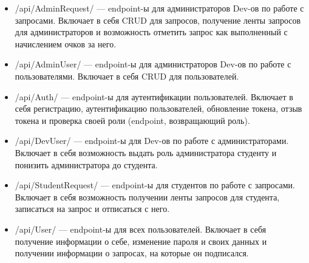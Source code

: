 \begin{itemize}
	\item{/api/AdminRequest/ --- endpoint-ы для администраторов Dev-ов по работе с запросами. Включает в себя CRUD для запросов, получение ленты запросов для администраторов и возможность отметить запрос как выполненный с начислением очков за него.}
	\item{/api/AdminUser/ --- endpoint-ы для администраторов Dev-ов по работе с пользователями. Включает в себя CRUD для пользователей.}
	\item{/api/Auth/ --- endpoint-ы для аутентификации пользователей. Включает в себя регистрацию, аутентификацию пользователей, обновление токена, отзыв токена и проверка своей роли (endpoint, возвращающий роль).}
	\item{/api/DevUser/ --- endpoint-ы для Dev-ов по работе с администраторами. Включает в себя возможность выдать роль администратора студенту и понизить администратора до студента.}
	\item{/api/StudentRequest/ --- endpoint-ы для студентов по работе с запросами. Включает в себя возможность получении ленты запросов для студента, записаться на запрос и отписаться с него.}
	\item{/api/User/ --- endpoint-ы для всех пользователей. Включает в себя получение информации о себе, изменение пароля и своих данных и получении информации о запросах, на которые он подписался.}
\end{itemize}

